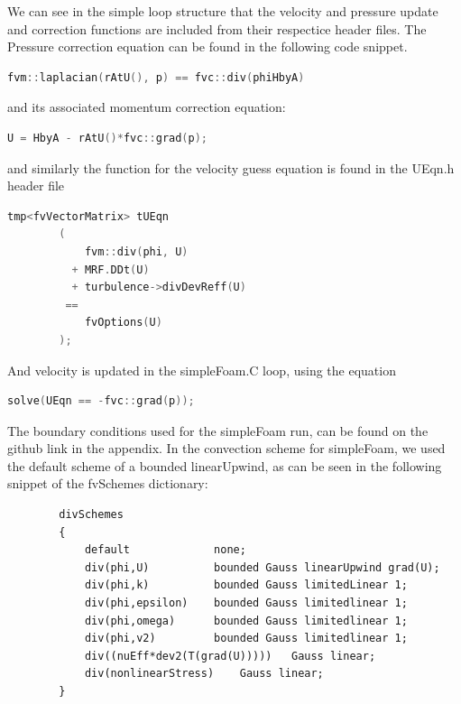 \documentclass[paper=a4, fontsize=11pt]{article} %
\numberwithin{equation}{section} %
\numberwithin{figure}{section} %
\numberwithin{table}{section} %
\begin{document}
    We can see in the simple loop structure that the velocity and pressure update and correction functions are included from their respectice header files. The Pressure correction equation can be found in the following code snippet.
    
    \begin{lstlisting}[language=C++]
        fvm::laplacian(rAtU(), p) == fvc::div(phiHbyA)
    \end{lstlisting}
    
    and its associated momentum correction equation:

    \begin{lstlisting}[language=C++]
        U = HbyA - rAtU()*fvc::grad(p);
    \end{lstlisting}

    and similarly the function for the velocity guess equation is found in the UEqn.h header file 
    
    \begin{lstlisting}[language=C++]
        tmp<fvVectorMatrix> tUEqn
        (
            fvm::div(phi, U)
          + MRF.DDt(U)
          + turbulence->divDevReff(U)
         ==
            fvOptions(U)
        );
    \end{lstlisting}

    And velocity is updated in the simpleFoam.C loop, using the equation

    \begin{lstlisting}[language=C++]
        solve(UEqn == -fvc::grad(p));
    \end{lstlisting}



    The boundary conditions used for the simpleFoam run, can be found on the github link in the appendix. 
    In the convection scheme for simpleFoam, we used the default scheme of a bounded linearUpwind, as can be seen in the following snippet of the fvSchemes dictionary:

    \begin{lstlisting}
        divSchemes
        {
            default             none;
            div(phi,U)          bounded Gauss linearUpwind grad(U);
            div(phi,k)          bounded Gauss limitedLinear 1;
            div(phi,epsilon)    bounded Gauss limitedlinear 1;
            div(phi,omega)      bounded Gauss limitedlinear 1;
            div(phi,v2)         bounded Gauss limitedlinear 1;
            div((nuEff*dev2(T(grad(U)))))   Gauss linear;
            div(nonlinearStress)    Gauss linear;
        }   
    \end{lstlisting}
\end{document}
